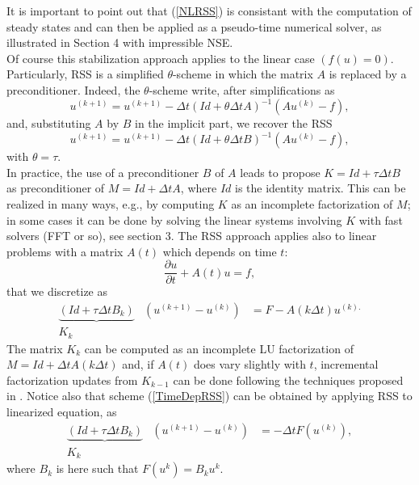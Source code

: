 \documentclass[11pt]{article}
\newcommand{\Frac}[2] {\frac{\textstyle #1} {\textstyle #2}}
\begin{document}
{It is important to point out that (\ref{NLRSS}) is consistant with the computation of steady states and can then be 
applied as a pseudo-time numerical solver, as illustrated in Section 4 with impressible NSE.\\

Of course this stabilization approach applies to the linear case $(f(u)=0)$. Particularly, 
RSS is a simplified $\theta$-scheme in which the matrix $A$ is replaced by a
preconditioner. Indeed, the $\theta$-scheme write, after
simplifications as
$$
u^{(k+1)}=u^{(k+1)}-\Delta t(Id +\theta\Delta t A)^{-1}(Au^{(k)}-f),
$$
and, substituting $A$ by $B$ in the implicit part, we recover the RSS
$$
u^{(k+1)}=u^{(k+1)}-\Delta t(Id +\theta\Delta t B)^{-1}(Au^{(k)}-f),
$$
with $\theta=\tau$.\\

In practice, the use of a preconditioner $B$ of $A$ leads to propose
$K=Id +\tau \Delta t B$ as preconditioner of $M=Id +\Delta t A$, where $Id$ is the identity matrix. This can be realized
in many ways, e.g., by computing $K$ as an incomplete factorization of $M$; in some cases it can be done by solving the linear systems involving $K$ with fast solvers (FFT or so), see section 3. The RSS approach applies also to linear problems with a matrix $A(t)$ which depends on time $t$: 
\begin{equation}
\Frac{\partial u}{\partial t} +A(t)u=f,
\end{equation}
that we discretize as
\begin{equation}
\begin{array}{cll}
\underbrace{(Id +\tau \Delta t B_k)}&(u^{(k+1)}-u^{(k)})&=F-A(k \Delta t)u^{(k).}\\
\mbox{$K_k$} & & 
\end{array}
\label{TimeDepRSS1}
\end{equation}
The matrix $K_k$ can be computed as an incomplete LU factorization of $M=Id +\Delta t A(k \Delta t)$ and, if $A(t)$ does vary slightly with $t$, incremental factorization updates from $K_{k-1}$ can be done following the techniques proposed in \cite{CalgaroChehabSaad}.
Notice also that scheme (\ref{TimeDepRSS}) can be obtained by applying RSS to linearized equation, as
\begin{equation}
\begin{array}{cll}
\underbrace{(Id +\tau \Delta t B_k)}&(u^{(k+1)}-u^{(k)})&=-\Delta t F(u^{(k)}),\\
\mbox{$K_k$} & & 
\end{array}
\label{TimeDepRSS}
\end{equation}
where $B_k$ is here such that $F(u^k)=B_k u^k$.
}
\end{document}
